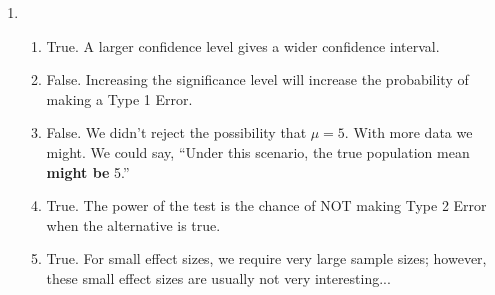 \documentclass[12pt,letterpaper]{article}
\begin{document}
\begin{enumerate}
\item \begin{enumerate}
\item True. A larger confidence level gives a wider confidence interval.
\item False. Increasing the significance level will increase the probability of making a Type 1 Error.
\item False. We didn't reject the possibility that $\mu=5$. With more data we might. We could say, ``Under this scenario, the true population mean {\bf might be} 5.''
\item True. The power of the test is the chance of NOT making Type 2 Error when the alternative is true.
\item True. For small effect sizes, we require very large sample sizes; however, these small effect sizes are usually not very interesting...
\end{enumerate}




\end{enumerate}
\end{document}
